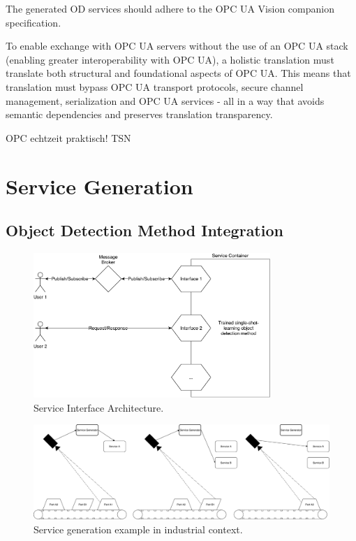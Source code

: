 The generated OD services should adhere to the OPC UA Vision companion specification. 

To enable exchange with OPC UA servers without the use of an OPC UA stack (enabling
greater interoperability with OPC UA), a holistic translation must translate both structural
and foundational aspects of OPC UA. This means that translation must bypass OPC UA
transport protocols, secure channel management, serialization and OPC UA services - all
in a way that avoids semantic dependencies and preserves translation transparency.

OPC echtzeit praktisch! TSN
\section{Service Generation}
\subsection{Object Detection Method Integration}

\begin{figure}[ht]
    \centering
    \includegraphics[width=0.8\textwidth]{img/ServiceArchitecture.pdf}
    \caption{Service Interface Architecture.}
    \label{fig:ServiceInterArchit}
\end{figure}

\begin{figure}[ht]
    \centering
    \includegraphics[width=\textwidth]{img/ServiceGenerationExample.pdf}
    \caption{Service generation example in industrial context.}
    \label{fig:ServiceGenExa}
\end{figure}

